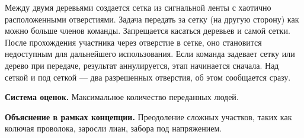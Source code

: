 
\par Между двумя деревьями создается сетка из сигнальной ленты с хаотично расположенными отверстиями. Задача передать за сетку (на другую сторону) как можно больше членов команды. Запрещается касаться деревьев и самой сетки. После прохождения участника через отверстие в сетке, оно становится недоступным для дальнейшего использования. Если команда задевает сетку или дерево при передаче, результат аннулируется, этап начинается сначала. Над сеткой и под сеткой --- два разрешенных отверстия, об этом сообщается сразу.

\par \textbf{Система оценок.} Максимальное количество переданных людей.

\par \textbf{Объяснение в рамках концепции.} Преодоление сложных участков, таких как колючая проволока, заросли лиан, забора под напряжением.